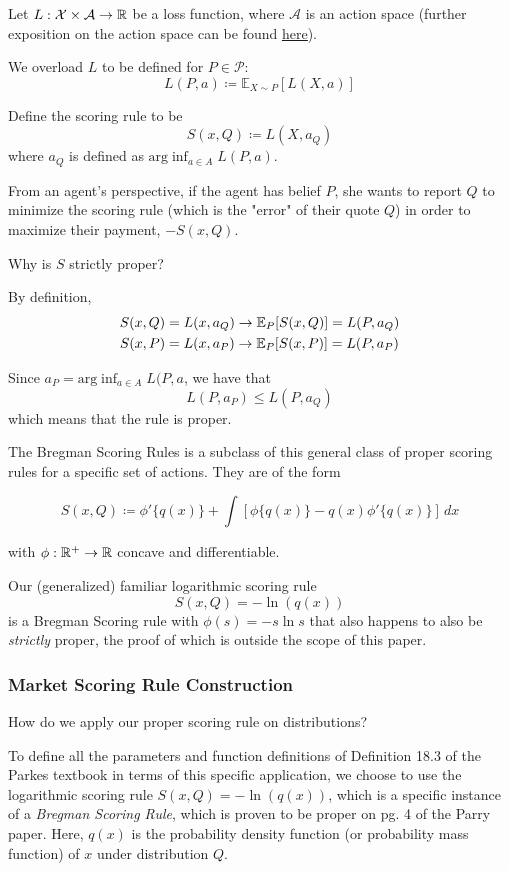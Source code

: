 Let $L: \mathcal{X}\times \mathcal{A}\to \mathbb{R}$ be a loss function, where $\mathcal{A}$ is an action space (further exposition on the action space can be found \underline{\href{http://www.ucl.ac.uk/statistics/research/pdfs/rr268.pdf}{here}})\cite{actionspaces}. 

We overload $L$ to be defined for $P\in \mathcal{P}$:
\[L(P,a) \coloneqq \mathbb{E}_{X\sim P}[L(X,a)]\]

Define the scoring rule to be
\[S(x,Q) \coloneqq L(X, a_Q)\]
where $a_Q$ is defined as $\mbox{arg}\inf_{a\in A}L(P,a)$. 

From an agent's perspective, if the agent has belief $P$, she wants to report $Q$ to minimize the scoring rule (which is the "error" of their quote $Q$) in  order to maximize their payment, $-S(x,Q)$. 

Why is $S$ strictly proper?

By definition, 
\begin{align*}
S(x,Q) &= L(x,a_Q) \rightarrow \mathbb{E}_P[S(x,Q)] = L(P,a_Q)\\
S(x,P) &= L(x,a_P) \rightarrow \mathbb{E}_P[S(x,P)] = L(P,a_P)\\
\end{align*}

Since $a_P = \mbox{arg}\inf_{a\in A}L(P,a$, we have that 
\[L(P,a_P) \le L(P,a_Q)\]
which means that the rule is proper.

The Bregman Scoring Rules \cite{distributions} is a subclass of this general class of proper scoring rules for a specific set of actions. They are of the form 

\[S(x,Q) \coloneqq \phi'\{q(x)\} + \int[\phi\{q(x)\}-q(x)\phi'\{q(x)\}]\,dx\]

with $\phi : \mathbb{R}^+\rightarrow \mathbb{R}$ concave and differentiable.

Our (generalized) familiar logarithmic scoring rule
\[S(x,Q) = -\ln(q(x))\] 
is a Bregman Scoring rule with $\phi(s) = -s\ln s$ that also happens to also be \textit{strictly} proper, the proof of which is outside the scope of this paper. 

\subsubsection{Market Scoring Rule Construction}
\label{sec:gen_scoring_rule}
How do we apply our proper scoring rule on distributions?

To define all the parameters and function definitions of Definition 18.3 of the Parkes textbook\cite{textbook} in terms of this specific application, 
we choose to use the logarithmic scoring rule $ S(x,Q) = -\ln(q(x))$, which is a specific instance of a \textit{Bregman Scoring Rule}, which is proven to be proper on pg. 4 of the Parry paper\cite{distributions}. Here, $q(x)$ is the probability density function (or probability mass function) of $x$ under distribution $Q$.

